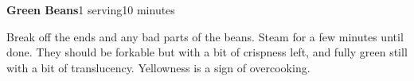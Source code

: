 \documentclass[../Cookbook.tex]{subfiles}
\begin{document}
\begin{recipe}[GreenBeans]{\textbf{Green Beans}}{1 serving}{10 minutes}

  Break off the ends and any bad parts of the beans.
  Steam for a few minutes until done. They should be forkable but with a bit of crispness left, and fully green still with a bit of translucency. Yellowness is a sign of overcooking.

\end{recipe}
\end{document}
